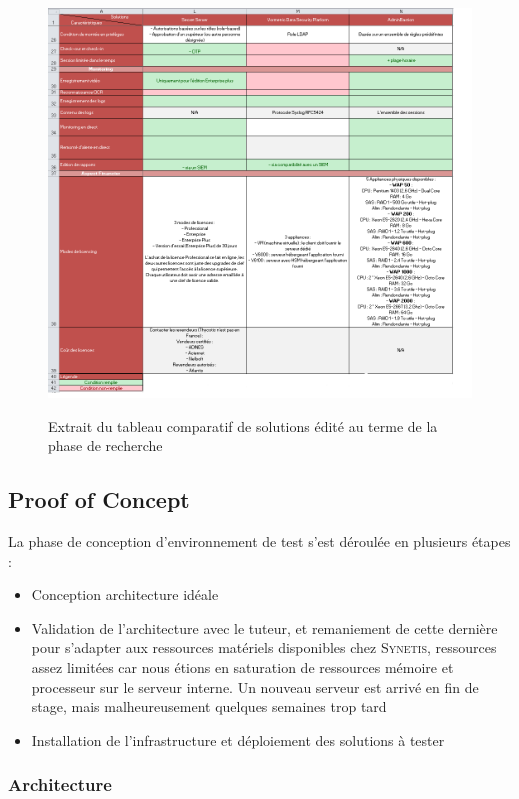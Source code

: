 \begin{figure}[!ht]
    \center
    \includegraphics[width=\textwidth]{./images/tabcomp.png}
    \label{fig:tabcomp}
    \caption{Extrait du tableau comparatif de solutions édité au terme de la phase de recherche}
\end{figure}

\subsection{Proof of Concept}
\label{subec:poc}

La phase de conception d'environnement de test s'est déroulée en plusieurs étapes :
\begin{itemize}
	\item Conception architecture idéale
	\item Validation de l'architecture avec le tuteur, et remaniement de cette dernière pour s'adapter aux ressources matériels disponibles chez \textsc{Synetis}, ressources assez limitées car nous étions en saturation de ressources mémoire et processeur sur le serveur interne. Un nouveau serveur est arrivé en fin de stage, mais malheureusement quelques semaines trop tard
	\item Installation de l'infrastructure et déploiement des solutions à tester
\end{itemize}

\subsubsection{Architecture}
\label{par:archi}

